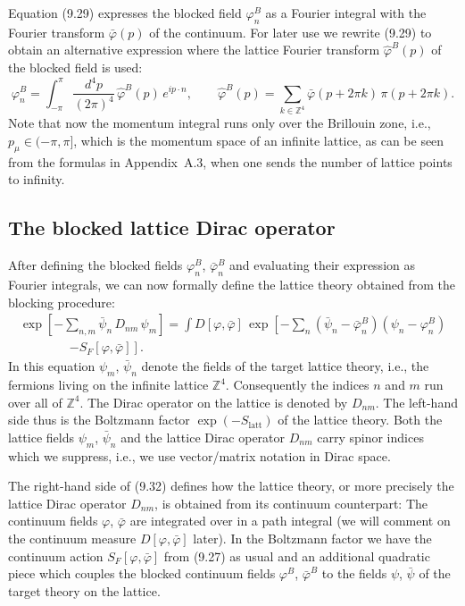 Equation (9.29) expresses the blocked field $\varphi^B_n$ as a Fourier
integral with the Fourier transform $\bar\varphi(p)$ of the continuum. For
later use we rewrite (9.29) to obtain an alternative expression where the
lattice Fourier transform $\hat\varphi^B(p)$ of the blocked field is used:
\begin{equation}
  \varphi^B_n = \int_{-\pi}^{\pi}\frac{d^4p}{(2\pi)^4}\,\hat\varphi^B(p)\,e^{ip\cdot n} ,
  \qquad
  \hat\varphi^B(p) = \sum_{k\in\mathbb{Z}^4}\bar\varphi(p+2\pi k)\,\pi(p+2\pi k) .
\end{equation}
Note that now the momentum integral runs only over the Brillouin zone, i.e.,
$p_\mu \in (-\pi, \pi]$, which is the momentum space of an infinite lattice, as
can be seen from the formulas in Appendix~A.3, when one sends the number of
lattice points to infinity.

\subsection{The blocked lattice Dirac operator}
\label{sec:9.2.2}

After defining the blocked fields $\varphi^B_n$, $\bar\varphi^B_n$ and
evaluating their expression as Fourier integrals, we can now formally define
the lattice theory obtained from the blocking procedure:
\begin{multline}
  \exp\!\left[-\sum_{n,m}\bar\psi_n\,D_{nm}\,\psi_m\right]
  = \int D[\varphi,\bar\varphi]\,
    \exp\!\left[-\sum_n\left(\bar\psi_n-\bar\varphi^B_n\right)
      \left(\psi_n-\varphi^B_n\right)\right. \\
  \qquad\qquad \left.- S_F[\varphi,\bar\varphi]\right] .
\end{multline}
In this equation $\psi_m$, $\bar\psi_n$ denote the fields of the target
lattice theory, i.e., the fermions living on the infinite lattice
$\mathbb{Z}^4$. Consequently the indices $n$ and $m$ run over all of
$\mathbb{Z}^4$. The Dirac operator on the lattice is denoted by $D_{nm}$. The
left-hand side thus is the Boltzmann factor $\exp(-S_{\mathrm{latt}})$ of the
lattice theory. Both the lattice fields $\psi_m$, $\bar\psi_n$ and the lattice
Dirac operator $D_{nm}$ carry spinor indices which we suppress, i.e., we use
vector/matrix notation in Dirac space.

The right-hand side of (9.32) defines how the lattice theory, or more
precisely the lattice Dirac operator $D_{nm}$, is obtained from its continuum
counterpart: The continuum fields $\varphi$, $\bar\varphi$ are integrated over
in a path integral (we will comment on the continuum measure
$D[\varphi,\bar\varphi]$ later). In the Boltzmann factor we have the continuum
action $S_F[\varphi,\bar\varphi]$ from (9.27) as usual and an additional
quadratic piece which couples the blocked continuum fields $\varphi^B$,
$\bar\varphi^B$ to the fields $\psi$, $\bar\psi$ of the target theory on the
lattice.

